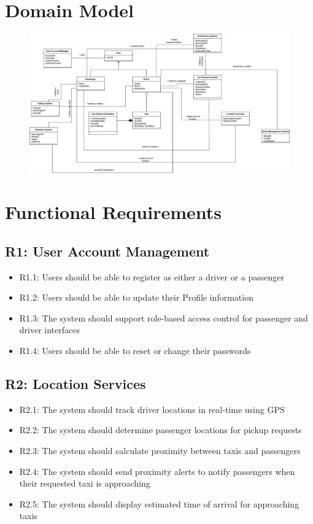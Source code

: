 \documentclass[a4paper,12pt]{article}
\begin{document}
\section{Domain Model}

\begin{figure}[h]
  \centering
  \includegraphics[width=1\textwidth]{Domain Model.jpg} 
\end{figure}

\section{Functional Requirements}

\subsection*{R1: User Account Management}
\begin{itemize}
    \item R1.1: Users should be able to register as either a driver or a passenger
    \item R1.2: Users should be able to update their Profile information
    \item R1.3: The system should support role-based access control for passenger and driver interfaces
    \item R1.4: Users should be able to reset or change their passwords
\end{itemize}

\subsection*{R2: Location Services}
\begin{itemize}
    \item R2.1: The system should track driver locations in real-time using GPS
    \item R2.2: The system should determine passenger locations for pickup requests
    \item R2.3: The system should calculate proximity between taxis and passengers
    \item R2.4: The system should send proximity alerts to notify passengers when their requested taxi is approaching
    \item R2.5: The system should display estimated time of arrival for approaching taxis 
\end{itemize}
\end{document}
